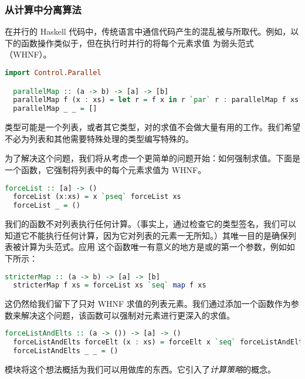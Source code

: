 \documentclass[./main.tex]{subfiles}
\begin{document}
\subsubsection*{从计算中分离算法}

在并行的 Haskell 代码中，传统语言中通信代码产生的混乱被与所取代。例如，以下的函数操作类似于，但在执行时并行的将每个元素求值
为弱头范式（WHNF）。

\begin{lstlisting}[language=Haskell]
  import Control.Parallel

  parallelMap :: (a -> b) -> [a] -> [b]
  parallelMap f (x : xs) = let r = f x in r `par` r : parallelMap f xs
  parallelMap _ _ = []
\end{lstlisting}

类型可能是一个列表，或者其它类型，对的求值不会做大量有用的工作。我们希望不必为列表和其他需要特殊处理的类型编写特殊的。

为了解决这个问题，我们将从考虑一个更简单的问题开始：如何强制求值。下面是一个函数，它强制将列表中的每个元素求值为 WHNF。

\begin{lstlisting}[language=Haskell]
  forceList :: [a] -> ()
  forceList (x:xs) = x `pseq` forceList xs
  forceList _ = ()
\end{lstlisting}

我们的函数不对列表执行任何计算。（事实上，通过检查它的类型签名，我们可以知道它不能执行任何计算，因为它对列表的元素一无所知。）其唯一目的是确保列表被计算为头范式。应用
这个函数唯一有意义的地方是或的第一个参数，例如如下所示：

\begin{lstlisting}[language=Haskell]
  stricterMap :: (a -> b) -> [a] -> [b]
  stricterMap f xs = forceList xs `seq` map f xs
\end{lstlisting}

这仍然给我们留下了只对 WHNF 求值的列表元素。我们通过添加一个函数作为参数来解决这个问题，该函数可以强制对元素进行更深入的求值。

\begin{lstlisting}[language=Haskell]
  forceListAndElts :: (a -> ()) -> [a] -> ()
  forceListAndElts forceElt (x : xs) = forceElt x `seq` forceListAndElts forceElt xs
  forceListAndElts _ _ = ()
\end{lstlisting}

模块将这个想法概括为我们可以用做库的东西。它引入了\textit{计算策略}的概念。
\end{document}
